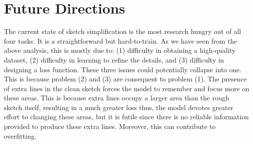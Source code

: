 \section{Future Directions}
The current state of sketch simplification is the most research hungry out of all four tasks. It is a straightforward but hard-to-train. As we have seen from the above analysis, this is mostly due to: (1) difficulty in obtaining a high-quality dataset,  (2) difficulty in learning to refine the details, and (3) difficulty in designing a loss function. These three issues could potentially collapse into one. This is because problem (2) and (3) are consequent to problem (1). 
The presence of extra lines in the clean sketch forces the model to remember and focus more on these areas. This is because extra lines occupy a larger area than the rough sketch itself, resulting in a much greater loss thus, the model devotes greater effort to changing these areas, but it is futile since there is no reliable information provided to produce these extra lines. Moreover, this can contribute to overfitting.


